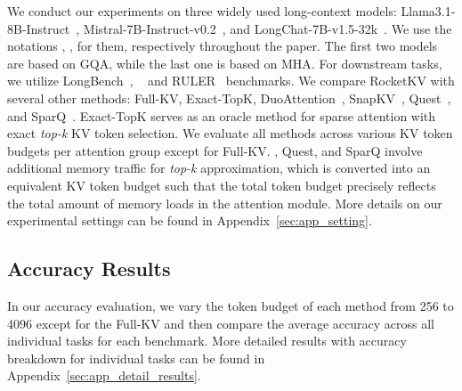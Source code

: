 We conduct our experiments on three widely used long-context models: Llama3.1-8B-Instruct~\cite{metaai2024}, Mistral-7B-Instruct-v0.2~\cite{mistral2023}, and LongChat-7B-v1.5-32k~\cite{longchat2023}. We use the notations \llama, \mistral, \longchat for them, respectively throughout the paper.
The first two models are based on GQA, while the last one
is based on MHA. For downstream tasks, we utilize LongBench~\cite{longbench2023}, \needle~\cite{needle2023} and RULER~\cite{ruler2024} benchmarks. We
compare RocketKV with several other methods: Full-KV, Exact-TopK, DuoAttention~\cite{duoattention2024}, SnapKV~\cite{snapkv2024}, Quest~\cite{quest2024}, and SparQ~\cite{sparq2024}. Exact-TopK serves as an oracle method for sparse attention with exact \textit{top-k} KV token selection. We evaluate all methods
across various KV token budgets per attention group except for Full-KV. \rocketkv,
Quest, and SparQ involve additional memory traffic for \textit{top-k}
approximation, which is converted into an equivalent KV token budget such that the total token budget precisely reflects
the total amount of memory loads in the attention module. More details on our experimental settings can be
found in Appendix~\ref{sec:app_setting}.



    











\subsection{Accuracy Results }
In our accuracy evaluation, we vary the token budget of each method from 256 to 4096 except for the Full-KV and then compare the average accuracy across all individual tasks for each benchmark. More detailed results with accuracy breakdown for individual tasks can be found in Appendix~\ref{sec:app_detail_results}.

